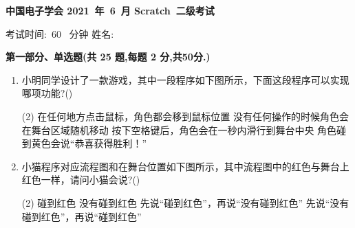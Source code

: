 \documentclass[10pt, a4paper]{article}
\newcommand{\Title}[3]{
    \begin{center}
        \Large \textbf{中国电子学会 #1~年~#2~月 Scratch~#3级考试}
    \end{center}
}
\newcommand{\TimeAndName}[1]{
    \begin{center}
        考试时间:~#1~ 分钟 \qquad\qquad\qquad\qquad 姓名:\underline{\quad\quad\quad\quad}
    \end{center}
}
\begin{document}
    \Title{2021}{6}{二} %
    \TimeAndName{60} %

    \vspace{2mm}
    {\noindent\textbf{第一部分、单选题(共 25 题,每题 2 分,共50分.)}}
    \begin{enumerate}
        \item 小明同学设计了一款游戏，其中一段程序如下图所示，下面这段程序可以实现哪项功能?(\qquad)
        \begin{tasks}(2)
            \task 在任何地方点击鼠标，角色都会移到鼠标位置
            \task 没有任何操作的时候角色会在舞台区域随机移动
            \task 按下空格键后，角色会在一秒内滑行到舞台中央
            \task 角色碰到黄色会说“恭喜获得胜利！”
        \end{tasks}

        \item 小猫程序对应流程图和在舞台位置如下图所示，其中流程图中的红色与舞台上红色一样，请问小猫会说?(\qquad)
        \begin{tasks}(2)
            \task 碰到红色
            \task 没有碰到红色
            \task 先说“碰到红色”，再说“没有碰到红色”
            \task 先说“没有碰到红色”，再说“碰到红色”
        \end{tasks}


\end{enumerate}
\end{document}
